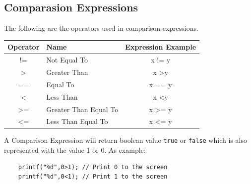 \subsection{Comparasion Expressions}
The following are the operators used in comparison expressions.
\begin{center}
	\begin{tabular}{|c|l|c|}
		\hline
		\textbf{Operator} & \textbf{Name}         & \multicolumn{1}{l|}{\textbf{Expression Example}} \\ \hline
		!=                & Not Equal To          & x != y                                           \\ \hline
		\textgreater{}    & Greater Than          & x \textgreater y                                 \\ \hline
		==                & Equal To              & x == y                                           \\ \hline
		\textless{}       & Less Than             & x \textless y                                    \\ \hline
		\textgreater{}=   & Greater Than Equal To & x \textgreater{}= y                              \\ \hline
		\textless{}=      & Less Than Equal To    & x \textless{}= y                                 \\ \hline
	\end{tabular}
\end{center}

A Comparison Expression will return boolean value \verb|true| or \verb|false| which is also represented with the value 1 or 0.
As example:
\begin{verbatim}
    printf("%d",0>1); // Print 0 to the screen
    printf("%d",0<1); // Print 1 to the screen
\end{verbatim}

